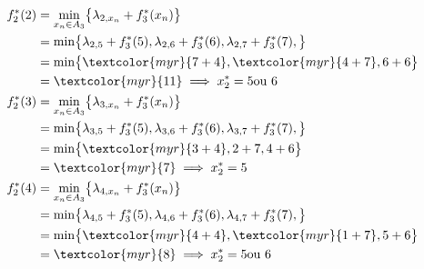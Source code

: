 \documentclass{report}
\begin{document}
\begin{multicols*}{2}
 \begin{align*}
    f^{*}_2(2)  &= \min_{x_n \in A_{3}}\bigl\{ \lambda_{2, x_n} 
    + f_3^{*}(x_n) \bigr\}
    \\ 
                &= 
                \min\bigl\{ 
                \lambda_{2, 5} + f_3^{*}(5), 
                \lambda_{2, 6} + f_3^{*}(6),
                \lambda_{2, 7} + f_3^{*}(7),
                \bigr\} 
                \\
                &= 
                \min\bigl\{
                \textcolor{myr}{7 + 4},
                \textcolor{myr}{4 + 7}, 
                6 + 6
                \bigr\}
                \\
                &= \textcolor{myr}{11} 
                \implies x_2^{*} = 5 \text{ou } 6 
                \\
    f^{*}_2(3)  &= \min_{x_n \in A_{3}}\bigl\{ \lambda_{3, x_n} 
    + f_3^{*}(x_n) \bigr\}
    \\ 
                &= 
                \min\bigl\{ 
                \lambda_{3, 5} + f_3^{*}(5), 
                \lambda_{3, 6} + f_3^{*}(6),
                \lambda_{3, 7} + f_3^{*}(7),
                \bigr\} 
                \\
                &= 
                \min\bigl\{
                \textcolor{myr}{3 + 4},
                2 + 7, 
                4 + 6
                \bigr\}
                \\
                &= \textcolor{myr}{7} 
                \implies x_2^{*} = 5 
    \\ 
    f^{*}_2(4)  &= \min_{x_n \in A_{3}}\bigl\{ \lambda_{4, x_n} 
    + f_3^{*}(x_n) \bigr\}
    \\ 
                &= 
                \min\bigl\{ 
                \lambda_{4, 5} + f_3^{*}(5), 
                \lambda_{4, 6} + f_3^{*}(6),
                \lambda_{4, 7} + f_3^{*}(7),
                \bigr\} 
                \\
                &= 
                \min\bigl\{
                \textcolor{myr}{4 + 4},
                \textcolor{myr}{1 + 7}, 
                5 + 6
                \bigr\}
                \\
                &= \textcolor{myr}{8} 
                \implies x_2^{*} = 5  \text{ou } 6  
    \end{align*}
\begin{table}[H]
    \renewcommand{\arraystretch}{2.0}
              \begin{center}
   \begin{tabular}{c|c|c}

\end{tabular}
\end{center}
\end{table}
\end{multicols*}
\end{document}
